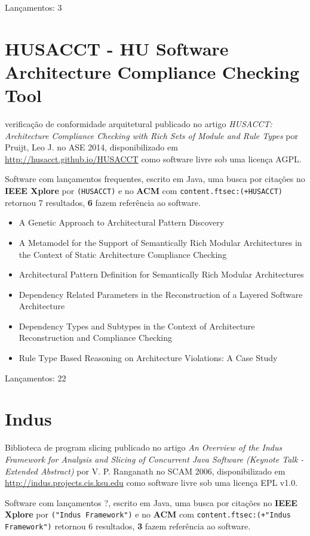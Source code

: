 Lançamentos: 3

\section{HUSACCT - HU Software Architecture Compliance Checking Tool}

verificação de conformidade arquitetural
publicado no artigo {\it HUSACCT: Architecture Compliance Checking with Rich Sets of Module and Rule Types}
por Pruijt, Leo J.
no ASE 2014,
disponibilizado em \url{http://husacct.github.io/HUSACCT}
como software livre
sob uma licença AGPL.

Software com lançamentos frequentes,
escrito em Java,
uma busca por citações no {\bf IEEE Xplore} por
\texttt{(HUSACCT)}
e no {\bf ACM} com
\texttt{content.ftsec:(+HUSACCT)}
retornou
7 resultados,
{\bf 6} fazem referência ao software.

\begin{itemize}
\item A Genetic Approach to Architectural Pattern Discovery
\item A Metamodel for the Support of Semantically Rich Modular Architectures in the Context of Static Architecture Compliance Checking
\item Architectural Pattern Definition for Semantically Rich Modular Architectures
\item Dependency Related Parameters in the Reconstruction of a Layered Software Architecture
\item Dependency Types and Subtypes in the Context of Architecture Reconstruction and Compliance Checking
\item Rule Type Based Reasoning on Architecture Violations: A Case Study
\end{itemize}

Lançamentos: 22

\section{Indus}

Biblioteca de program slicing
publicado no artigo {\it An Overview of the Indus Framework for Analysis and Slicing of Concurrent Java Software (Keynote Talk - Extended Abstract)}
por V. P. Ranganath
no SCAM 2006,
disponibilizado em \url{http://indus.projects.cis.ksu.edu}
como software livre
sob uma licença EPL v1.0.

Software com lançamentos ?,
escrito em Java,
uma busca por citações no {\bf IEEE Xplore} por
\texttt{("Indus Framework")}
e no {\bf ACM} com
\texttt{content.ftsec:(+"Indus Framework")}
retornou
6 resultados,
{\bf 3} fazem referência ao software.

